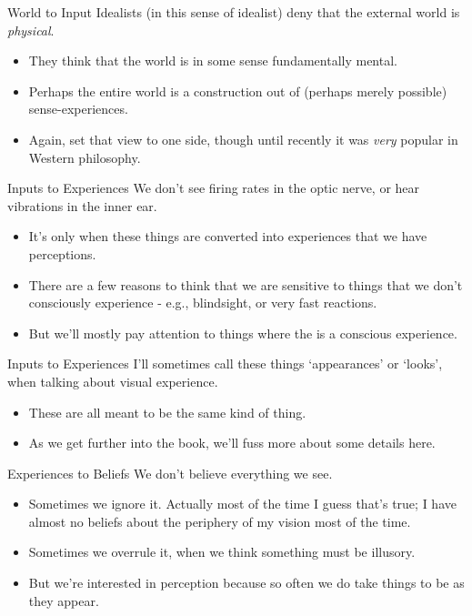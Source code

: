 \documentclass[
  17pt,
  letterpaper,
  ignorenonframetext,
  aspectratio=169,
  handout,
  xcolor={dvipsnames}]{beamer}
\providecommand{\tightlist}{%
  \setlength{\itemsep}{0pt}\setlength{\parskip}{0pt}}\usepackage{longtable,booktabs,array}
\begin{document}
\begin{frame}{World to Input}
\protect\hypertarget{world-to-input}{}
Idealists (in this sense of idealist) deny that the external world is
\emph{physical}.

\begin{itemize}[<+->]
\tightlist
\item
  They think that the world is in some sense fundamentally mental.
\item
  Perhaps the entire world is a construction out of (perhaps merely
  possible) sense-experiences.
\item
  Again, set that view to one side, though until recently it was
  \emph{very} popular in Western philosophy.
\end{itemize}
\end{frame}

\begin{frame}{Inputs to Experiences}
\protect\hypertarget{inputs-to-experiences}{}
We don't see firing rates in the optic nerve, or hear vibrations in the
inner ear.

\begin{itemize}[<+->]
\tightlist
\item
  It's only when these things are converted into experiences that we
  have perceptions.
\item
  There are a few reasons to think that we are sensitive to things that
  we don't consciously experience - e.g., blindsight, or very fast
  reactions.
\item
  But we'll mostly pay attention to things where the is a conscious
  experience.
\end{itemize}
\end{frame}

\begin{frame}{Inputs to Experiences}
\protect\hypertarget{inputs-to-experiences-1}{}
I'll sometimes call these things `appearances' or `looks', when talking
about visual experience.

\begin{itemize}[<+->]
\tightlist
\item
  These are all meant to be the same kind of thing.
\item
  As we get further into the book, we'll fuss more about some details
  here.
\end{itemize}
\end{frame}

\begin{frame}{Experiences to Beliefs}
\protect\hypertarget{experiences-to-beliefs}{}
We don't believe everything we see.

\begin{itemize}[<+->]
\tightlist
\item
  Sometimes we ignore it. Actually most of the time I guess that's true;
  I have almost no beliefs about the periphery of my vision most of the
  time.
\item
  Sometimes we overrule it, when we think something must be illusory.
\item
  But we're interested in perception because so often we do take things
  to be as they appear.
\end{itemize}
\end{frame}
\end{document}
